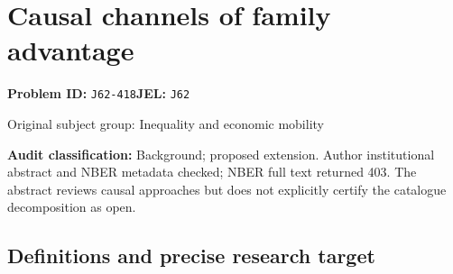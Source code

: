 \documentclass[11pt,a4paper]{article}
\begin{document}
\section*{Causal channels of family advantage}
\textbf{Problem ID:} \texttt{J62-418}\quad \textbf{JEL:} \texttt{J62}\par
\label{problem:OP-0363}
{\sffamily\small\color{muted}Original subject group: Inequality and economic mobility\par}
\label{definitions:problem:30007645}
\textbf{Audit classification:} Background; proposed extension. Author institutional abstract and NBER metadata checked; NBER full text returned 403. The abstract reviews causal approaches but does not explicitly certify the catalogue decomposition as open.
\subsection*{Definitions and precise research target}
\end{document}
